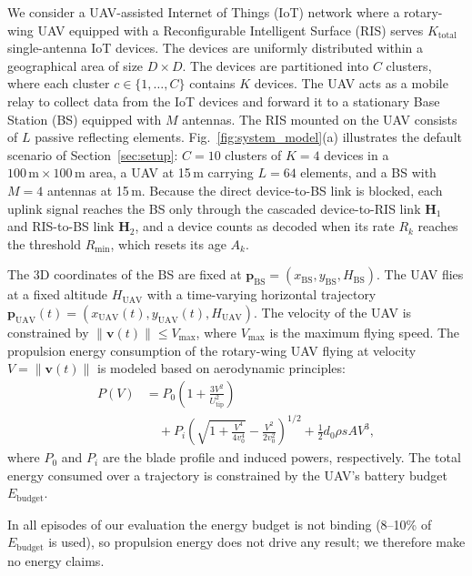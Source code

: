 \documentclass[journal]{IEEEtran}
\begin{document}
We consider a UAV-assisted Internet of Things (IoT) network where a rotary-wing UAV equipped with a Reconfigurable Intelligent Surface (RIS) serves $K_{\text{total}}$ single-antenna IoT devices. The devices are uniformly distributed within a geographical area of size $D \times D$. The devices are partitioned into $C$ clusters, where each cluster $c \in \{1, \dots, C\}$ contains $K$ devices. The UAV acts as a mobile relay to collect data from the IoT devices and forward it to a stationary Base Station (BS) equipped with $M$ antennas. The RIS mounted on the UAV consists of $L$ passive reflecting elements. Fig.~\ref{fig:system_model}(a) illustrates the default scenario of Section~\ref{sec:setup}: $C=10$ clusters of $K=4$ devices in a $100\,\text{m}\times100\,\text{m}$ area, a UAV at 15\,m carrying $L=64$ elements, and a BS with $M=4$ antennas at 15\,m. Because the direct device-to-BS link is blocked, each uplink signal reaches the BS only through the cascaded device-to-RIS link $\mathbf{H}_1$ and RIS-to-BS link $\mathbf{H}_2$, and a device counts as decoded when its rate $R_k$ reaches the threshold $R_{\min}$, which resets its age $A_k$. 

The 3D coordinates of the BS are fixed at $\mathbf{p}_{\text{BS}} = (x_{\text{BS}}, y_{\text{BS}}, H_{\text{BS}})$. The UAV flies at a fixed altitude $H_{\text{UAV}}$ with a time-varying horizontal trajectory $\mathbf{p}_{\text{UAV}}(t) = (x_{\text{UAV}}(t), y_{\text{UAV}}(t), H_{\text{UAV}})$. The velocity of the UAV is constrained by $\|\mathbf{v}(t)\| \leq V_{\text{max}}$, where $V_{\text{max}}$ is the maximum flying speed. The propulsion energy consumption of the rotary-wing UAV flying at velocity $V = \|\mathbf{v}(t)\|$ is modeled based on aerodynamic principles:
\begin{equation}
\begin{split}
    P(V) &= P_0 \left(1 + \frac{3V^2}{U_{\text{tip}}^2}\right) \\
    &\quad + P_i \left( \sqrt{1 + \frac{V^4}{4v_0^4}} - \frac{V^2}{2v_0^2} \right)^{1/2} + \frac{1}{2} d_0 \rho s A V^3,
\end{split}
\end{equation}
where $P_0$ and $P_i$ are the blade profile and induced powers, respectively. The total energy consumed over a trajectory is constrained by the UAV's battery budget $E_{\text{budget}}$.

In all episodes of our evaluation the energy budget is not binding (8--10\% of $E_{\text{budget}}$ is used), so propulsion energy does not drive any result; we therefore make no energy claims.
\end{document}
